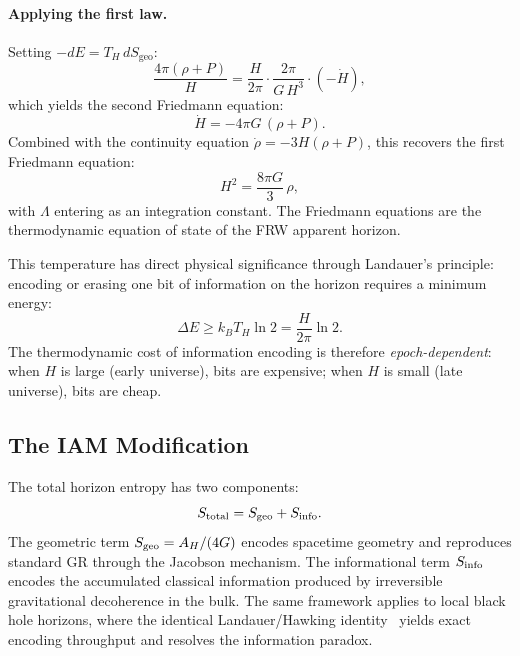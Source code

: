 \documentclass[twocolumn,a4paper,aps,prd,twocolumn,showpacs,notitlepage,superscriptaddress,nofootinbib]{article}
\begin{document}
\paragraph{Applying the first law.}
Setting $-dE = T_H\,dS_\mathrm{geo}$:
\begin{equation}
\frac{4\pi(\rho + P)}{H} = \frac{H}{2\pi}\cdot\frac{2\pi}{G\,H^3}\cdot(-\dot{H}),
\end{equation}
which yields the second Friedmann equation:
\begin{equation}
\dot{H} = -4\pi G\,(\rho + P).
\label{eq:friedmann2}
\end{equation}
Combined with the continuity equation $\dot{\rho} = -3H(\rho + P)$, this
recovers the first Friedmann equation:
\begin{equation}
H^2 = \frac{8\pi G}{3}\,\rho,
\label{eq:friedmann1}
\end{equation}
with $\Lambda$ entering as an integration constant.  The Friedmann equations
are the thermodynamic equation of state of the FRW apparent horizon.

This temperature has direct physical significance through Landauer's
principle: encoding or erasing one bit of information on the horizon
requires a minimum energy:
\begin{equation}
\Delta E \geq k_B T_H \ln 2 = \frac{H}{2\pi}\ln 2.
\label{eq:Landauer_horizon}
\end{equation}
The thermodynamic cost of information encoding is therefore
\textit{epoch-dependent}: when $H$ is large (early universe), bits are
expensive; when $H$ is small (late universe), bits are cheap.

\subsection{The IAM Modification}
\label{sec:iam_mod}

The total horizon entropy has two components:
\begin{equation}
  S_{\rm total} = S_{\rm geo} + S_{\rm info}.
  \label{eq:stotal}
\end{equation}
The geometric term $S_{\rm geo} = A_H/(4G)$ encodes spacetime geometry and
reproduces standard GR through the Jacobson mechanism.  The informational term
$S_{\rm info}$ encodes the accumulated classical information produced by
irreversible gravitational decoherence in the bulk.  The same framework applies
to local black hole horizons, where the identical Landauer/Hawking identity~\citep{Hawking1975}
yields exact encoding throughput and resolves the information
paradox.
\end{document}
